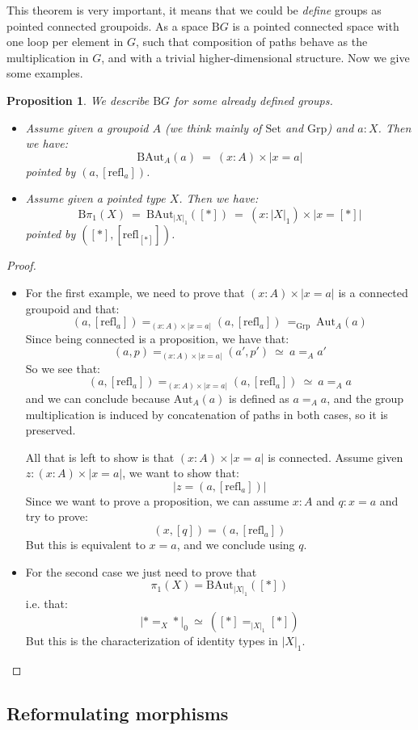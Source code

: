 \documentclass{article}
\newcommand{\sse}[1]{\medbreak \subsection{#1}}
\newcommand{\refl}{\mathrm{refl}}
\newcommand{\Grp}{\mathrm{Grp}}
\newcommand{\B}{\mathrm{B}}
\newcommand{\Aut}{\mathrm{Aut}}
\newcommand{\Set}{\mathrm{Set}}
\newtheorem{proposition}{Proposition}
\begin{document}
This theorem is very important, it means that we could be \emph{define} groups as pointed connected groupoids. As a space $\B G$ is a pointed connected space with one loop per element in $G$, such that composition of paths behave as the multiplication in $G$, and with a trivial higher-dimensional structure. Now we give some examples.

\begin{proposition}
We describe $\B G$ for some already defined groups.
\begin{itemize}
\item Assume given a groupoid $A$ (we think mainly of $\Set$ and $\Grp$) and $a:X$. Then we have:
\[\B \Aut_A(a) \ = \ (x:A)\times |x=a|\]
pointed by $(a,[\refl_a])$.
\item Assume given a pointed type $X$. Then we have:
\[\B\pi_1(X) \ = \ \B\Aut_{|X|_1}([*])\ = \ (x:|X|_1)\times |x=[*]|\]
pointed by $([*],[\refl_{[*]}])$.
\end{itemize}
\end{proposition}
\begin{proof}
\begin{itemize}
\item For the first example, we need to prove that $(x:A)\times |x=a|$ is a connected groupoid and that: 
\[(a,[\refl_a]) =_{(x:A)\times |x=a|}(a,[\refl_a])\ =_\Grp\ \Aut_A(a)\]
Since being connected is a proposition, we have that:
\[(a,p) =_{(x:A)\times |x=a|} (a',p') \ \simeq \ a=_Aa'\]
So we see that:
\[(a,[\refl_a]) =_{(x:A)\times |x=a|}(a,[\refl_a])\ \simeq\ a=_Aa\]
and we can conclude because $\Aut_A(a)$ is defined as $a=_Aa$, and the group multiplication is induced by concatenation of paths in both cases, so it is preserved.

All that is left to show is that $(x:A)\times |x=a|$ is connected. Assume given $z:(x:A)\times |x=a|$, we want to show that:
\[|z = (a,[\refl_a])|\]
Since we want to prove a proposition, we can assume $x:A$ and $q:x=a$ and try to prove:
\[(x,[q]) = (a,[\refl_a])\]
But this is equivalent to $x=a$, and we conclude using $q$.

\item For the second case we just need to prove that 
\[\pi_1(X) = \B\Aut_{|X|_1}([*])\]
i.e. that:
\[|*=_X*|_0 \ \simeq\ ([*] =_{|X|_1} [*])\] 
But this is the characterization of identity types in $|X|_1$. 
\end{itemize} 
\end{proof}


\sse{Reformulating morphisms}
\end{document}
